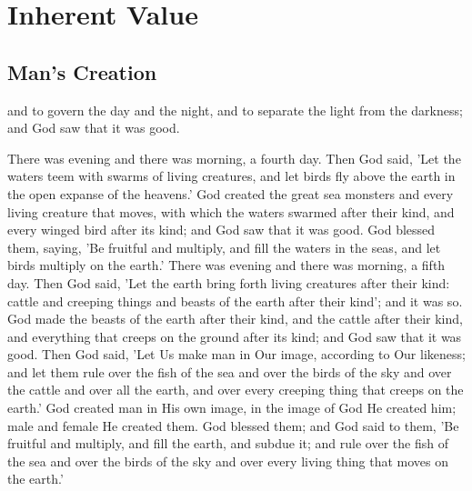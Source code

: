 \chapter{Inherent Value}

\section{Man's Creation}

\begin{scripture}[Gen 1:18--28]
    and to govern the day and the night, and to separate the light from the darkness; and God saw that it was good.
    \begin{poetry}
        There was evening and there was morning, a fourth day.
        Then God said, 'Let the waters teem with swarms of living creatures, and let birds fly above the earth in the open expanse of the heavens.'
        God created the great sea monsters and every living creature that moves, with which the waters swarmed after their kind, and every winged bird after its kind; and God saw that it was good.
        God blessed them, saying, 'Be fruitful and multiply, and fill the waters in the seas, and let birds multiply on the earth.'
        There was evening and there was morning, a fifth day.
        Then God said, 'Let the earth bring forth living creatures after their kind: cattle and creeping things and beasts of the earth after their kind'; and it was so.
        God made the beasts of the earth after their kind, and the cattle after their kind, and everything that creeps on the ground after its kind; and God saw that it was good.
        Then God said, 'Let Us make man in Our image, according to Our likeness; and let them rule over the fish of the sea and over the birds of the sky and over the cattle and over all the earth, and over every creeping thing that creeps on the earth.'
        God created man in His own image, in the image of God He created him; male and female He created them.
        God blessed them; and God said to them, 'Be fruitful and multiply, and fill the earth, and subdue it; and rule over the fish of the sea and over the birds of the sky and over every living thing that moves on the earth.'
    \end{poetry}
\end{scripture}


